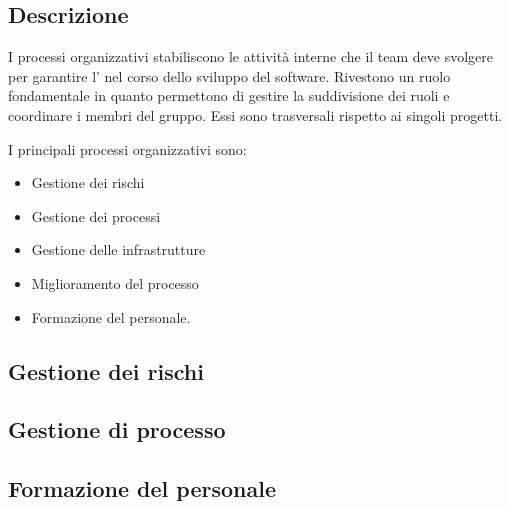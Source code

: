 \documentclass[../norme-di-progetto.tex]{subfiles}
\begin{document}
\subsection{Descrizione}%
\label{sub:processi_organizzativi/descrizione}

I processi organizzativi stabiliscono le attività interne che il team deve svolgere per garantire l' nel corso dello sviluppo del software.
Rivestono un ruolo fondamentale in quanto permettono di gestire la suddivisione dei ruoli e coordinare i membri del gruppo.
Essi sono trasversali rispetto ai singoli progetti.

I principali processi organizzativi sono:

\begin{itemize}
  \item Gestione dei rischi
  \item Gestione dei processi
  \item Gestione delle infrastrutture
  \item Miglioramento del processo
  \item Formazione del personale.
\end{itemize}

\subsection{Gestione dei rischi}%
\label{sub:gestione_dei_rischi}



\subsection{Gestione di processo}%
\label{sub:gestione_di_processo}



\subsection{Formazione del personale}%
\label{sub:formazione_del_personale}


\end{document}

